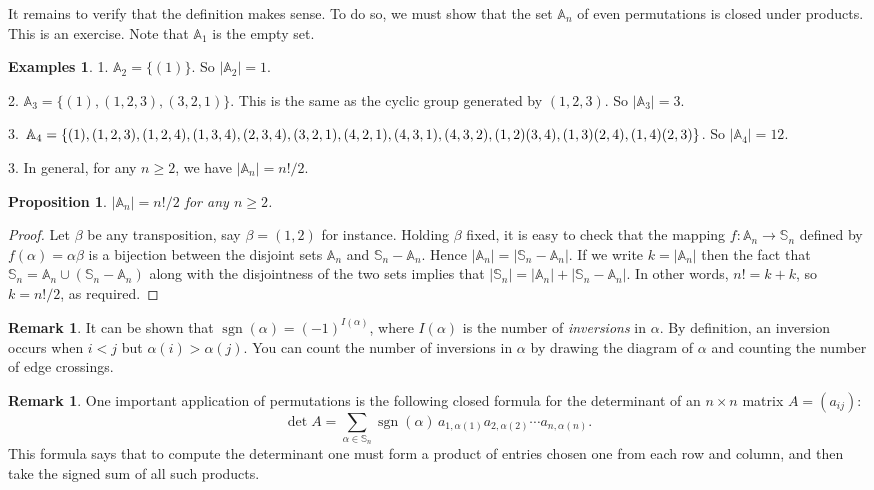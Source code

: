 \documentclass[11pt]{article}
\newtheorem{prop}[thm]{Proposition}
\theoremstyle{definition}
\newtheorem{examples}[thm]{Examples}
\newtheorem{rmk}[thm]{Remark}
\newcommand{\sgn}{\operatorname{sgn}}
\newcommand{\Sym}{\mathbb{S}}
\newcommand{\Alt}{\mathbb{A}}
\begin{document}
It remains to verify that the definition makes sense. To do so, we
must show that the set $\Alt_n$ of even permutations is closed under
products. This is an exercise. Note that $\Alt_1$ is the empty set.


\begin{examples}
  1. $\Alt_2 = \{ (1) \}$. So $|\Alt_2| = 1$.

  2. $\Alt_3 = \{ (1), (1,2,3), (3,2,1) \}$. This is the same as the
  cyclic group generated by $(1,2,3)$. So $|\Alt_3| = 3$. 

  3. $\Alt_4 = \{ (1), (1,2,3), (1,2,4), (1,3,4), (2,3,4), (3,2,1),
  (4,2,1), (4,3,1), \\(4,3,2),  (1,2)(3,4), (1,3)(2,4), (1,4)(2,3)\}$. So
  $|\Alt_4| = 12$.

  3. In general, for any $n \ge 2$, we have $|\Alt_n| = n!/2$. 
\end{examples}

\begin{prop}
  $|\Alt_n| = n!/2$ for any $n \ge 2$. 
\end{prop}

\begin{proof}
Let $\beta$ be any transposition, say $\beta = (1,2)$ for instance.
Holding $\beta$ fixed, it is easy to check that the mapping $f: \Alt_n
\to \Sym_n$ defined by $f(\alpha) = \alpha\beta$ is a bijection
between the disjoint sets $\Alt_n$ and $\Sym_n - \Alt_n$. Hence
$|\Alt_n| = |\Sym_n-\Alt_n|$. If we write $k = |\Alt_n|$ then the fact
that $\Sym_n = \Alt_n \cup (\Sym_n - \Alt_n)$ along with the
disjointness of the two sets implies that $|\Sym_n| = |\Alt_n| +
|\Sym_n - \Alt_n|$. In other words, $n! = k+k$, so $k = n!/2$, as
required.
\end{proof}


\begin{rmk}
  It can be shown that $\sgn(\alpha) = (-1)^{I(\alpha)}$, where
  $I(\alpha)$ is the number of \emph{inversions} in
  $\alpha$. By definition, an inversion occurs when $i < j$ but
  $\alpha(i) > \alpha(j)$. You can count the number of inversions in
  $\alpha$ by drawing the diagram of $\alpha$ and counting the number
  of edge crossings.
\end{rmk}


\begin{rmk} 
One important application of permutations is the following closed
formula for the determinant of an $n \times n$
matrix $A = (a_{ij})$:
\[
\det A = \sum_{\alpha \in \Sym_n} \sgn(\alpha)\, a_{1,\alpha(1)}
a_{2,\alpha(2)} \cdots a_{n,\alpha(n)}. 
\]
This formula says that to compute the determinant one must form a
product of entries chosen one from each row and column, and then take
the signed sum of all such products. 
\end{rmk}
\end{document}
